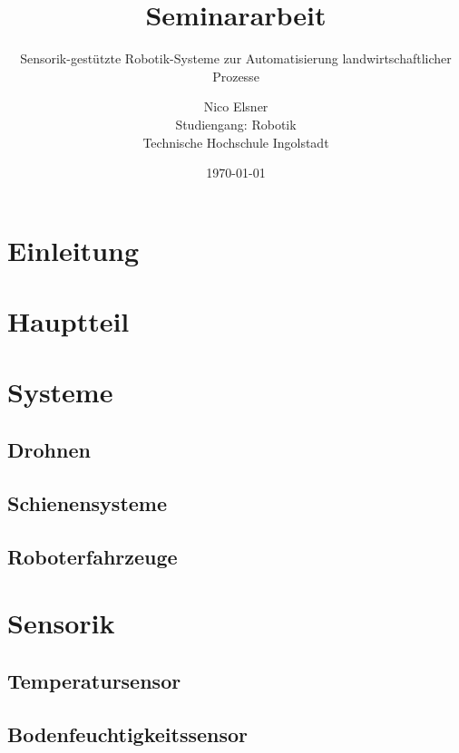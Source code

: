 \documentclass[a4paper,
			   11pt,
			   ngerman, 
			   ]{scrreprt}
\begin{document}
	\title{Seminararbeit}
	\subtitle{Sensorik-gestützte Robotik-Systeme zur Automatisierung landwirtschaftlicher Prozesse}
	\author{Nico Elsner\\
	Studiengang: Robotik\\
	Technische Hochschule Ingolstadt}
	\date{\today}
	\maketitle
	\tableofcontents
	\thispagestyle{empty}
	\newpage
	\setcounter{page}{1}
	\chapter{Einleitung}
	
	\chapter{Hauptteil}
	
	
	\chapter{Systeme}
		\section{Drohnen}
		
		\section{Schienensysteme}
		
		\section{Roboterfahrzeuge}
		

	\chapter{Sensorik}
	
		\section{Temperatursensor}
		
		\section{Bodenfeuchtigkeitssensor}
		
\end{document}
